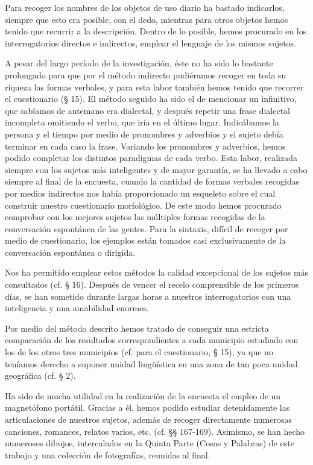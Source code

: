 \documentclass[11pt,spanish,b5paper]{book}
\begin{document}
Para recoger los nombres de los objetos de uso diario ha bastado indicarlos, siempre que esto era posible, con el dedo, mientras para otros objetos hemos tenido que recurrir a la descripción. Dentro de lo posible, hemos procurado en los interrogatorios directos e indirectos, emplear el lenguaje de los mismos sujetos. 

A pesar del largo período de la investigación, éste no ha sido lo bastante prolongado para que por el método indirecto pudiéramos recoger en toda su riqueza las formas verbales, y para esta labor también hemos tenido que recorrer el cuestionario (§ 15). El método seguido ha sido el de mencionar un infinitivo, que sabíamos de antemano era dialectal, y después repetir una frase dialectal incompleta omitiendo el verbo, que iría en el último lugar. Indicábamos la persona y el tiempo por medio de pronombres y adverbios y el sujeto debía terminar en cada caso la frase. Variando los pronombres y adverbios, hemos podido completar los distintos paradigmas de cada verbo. Esta labor, realizada siempre con los sujetos más inteligentes y de mayor garantía, se ha llevado a cabo siempre al final de la encuesta, cuando la cantidad de formas verbales recogidas por medios indirectos nos había proporcionado un esqueleto sobre el cual construir nuestro cuestionario morfológico. De este modo hemos procurado comprobar con los mejores sujetos las múltiples formas recogidas de la conversación espontánea de las gentes. Para la sintaxis, difícil de recoger por medio de cuestionario, los ejemplos están tomados casi exclusivamente de la conversación espontánea o dirigida. 

Nos ha permitido emplear estos métodos la calidad excepcional de los sujetos más consultados (cf. § 16). Después de vencer el recelo comprensible de los primeros días, se han sometido durante largas horas a nuestros interrogatorios con una inteligencia y una amabilidad enormes.

Por medio del método descrito hemos tratado de conseguir una estricta comparación de los resultados correspondientes a cada municipio estudiado con los de los otros tres municipios (cf. para el cuestionario, § 15), ya que no teníamos derecho a suponer unidad lingüística en una zona de tan poca unidad geográfica (cf. § 2). 

Ha sido de mucha utilidad en la realización de la encuesta el empleo de un magnetófono portátil. Gracias a él, hemos podido estudiar detenidamente las articulaciones de nuestros sujetos, además de recoger directamente numerosas canciones, romances, relatos varios, etc. (cf. §§ 167-169). Asimismo, se han hecho numerosos dibujos, intercalados en la Quinta Parte (Cosas y Palabras) de este trabajo y una colección de fotografías, reunidas al final. 
\end{document}
